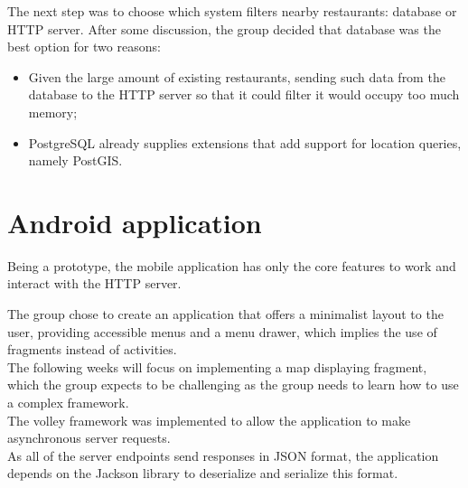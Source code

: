 The next step was to choose which system filters nearby restaurants: database or HTTP server. After some discussion, the group decided that database was the best
option for two reasons: 
\begin{itemize}
    \item Given the large amount of existing restaurants, sending such data from the database to the HTTP server so that it could filter it would occupy too much memory;
    \item PostgreSQL already supplies extensions that add support for location queries, namely PostGIS.
\end{itemize}

\section{Android application}

Being a prototype, the mobile application has only the core features to work and interact with the HTTP server.

The group chose to create an application that offers a minimalist layout to the user, providing accessible menus and a
menu drawer, which implies the use of fragments instead of activities.\\

The following weeks will focus on implementing a map displaying fragment, which the group expects to be challenging as the group needs to learn how to use a complex framework.\\

The volley framework was implemented to allow the application to make asynchronous server requests.\\

As all of the server endpoints send responses in JSON format, the application depends on the Jackson library to deserialize and serialize this format.